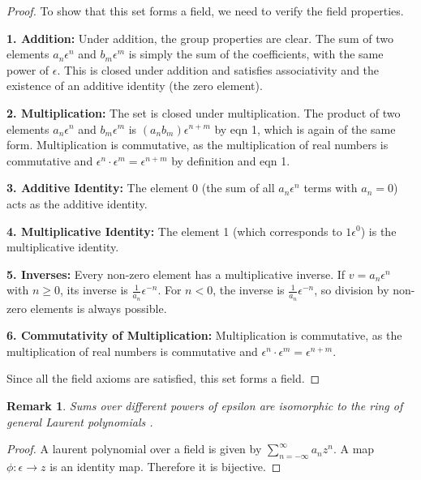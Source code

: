 \documentclass[10pt, oneside]{article}
\newtheorem{rem}{Remark}
\begin{document}
\begin{proof}
    To show that this set forms a field, we need to verify the field properties.

    \textbf{1. Addition:} Under addition, the group properties are clear. The sum of two elements \( a_n \epsilon^n \) and \( b_m \epsilon^m \) is simply the sum of the coefficients, with the same power of \( \epsilon \). This is closed under addition and satisfies associativity and the existence of an additive identity (the zero element).

    \textbf{2. Multiplication:} The set is closed under multiplication. The product of two elements \( a_n \epsilon^n \) and \( b_m \epsilon^m \) is \( (a_n b_m) \epsilon^{n+m} \) by eqn 1, which is again of the same form. Multiplication is commutative, as the multiplication of real numbers is commutative and \( \epsilon^n \cdot \epsilon^m = \epsilon^{n+m} \) by definition and eqn 1.

    \textbf{3. Additive Identity:} The element 0 (the sum of all \( a_n \epsilon^n \) terms with \( a_n = 0 \)) acts as the additive identity.

    \textbf{4. Multiplicative Identity:} The element 1 (which corresponds to \(1  \epsilon^0 \)) is the multiplicative identity.

    \textbf{5. Inverses:} Every non-zero element has a multiplicative inverse. If \( v = a_n \epsilon^n \) with \( n \geq 0 \), its inverse is \( \frac{1}{a_n} \epsilon^{-n} \). For \( n < 0 \), the inverse is \( \frac{1}{a_n} \epsilon^{-n} \), so division by non-zero elements is always possible.

    \textbf{6. Commutativity of Multiplication:} Multiplication is commutative, as the multiplication of real numbers is commutative and \( \epsilon^n \cdot \epsilon^m = \epsilon^{n+m} \).

    Since all the field axioms are satisfied, this set forms a field.
\end{proof}
\begin{rem}
    Sums over different powers of epsilon are isomorphic to the ring of general Laurent polynomials \cite{beck2020}.
\end{rem}
\begin{proof}
    A laurent polynomial over a field is given by $\sum_{n=-\infty}^{\infty} a_{n}z^{n}$. A map $\phi: \epsilon \to z$ is an identity map. Therefore it is bijective. 
\end{proof}
\end{document}
